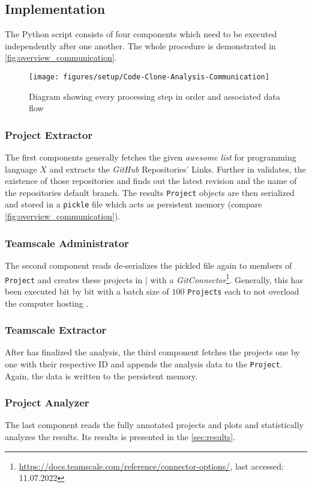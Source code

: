 \subsection{Implementation}
\label{sec:implementation}

The Python script consists of four components which need to be executed independently after one another. The whole procedure is demonstrated in \autoref{fig:overview_communication}.

\begin{figure}[htb]
	\centering
	\texttt{[image: figures/setup/Code-Clone-Analysis-Communication]}
	\caption{Diagram showing every processing step in order and associated data flow}
	\label{fig:overview_communication}
\end{figure}

\subsubsection{Project Extractor}

The first components generally fetches the given \textit{awesome list} for programming language $X$ and extracts the \textit{GitHub} Repositories' Links. Further in validates, the existence of those repositories and finds out the latest revision and the name of the repositories default branch. The results \texttt{Project} objects are then serialized and stored in a \texttt{pickle} file which acts as persistent memory (compare \autoref{fig:overview_communication}).

\subsubsection{Teamscale Administrator}

The second component reads de-serializes the pickled file again to members of \texttt{Project} and creates these projects in \teamscale|{} with a \textit{GitConnector}\footnote{\url{https://docs.teamscale.com/reference/connector-options/}, last accessed: 11.07.2022}. Generally, this has been executed bit by bit with a batch size of $100$ \texttt{Projects} each to not overload the computer hosting \teamscale{}.

\subsubsection{Teamscale Extractor}

After \teamscale{} has finalized the analysis, the third component fetches the projects one by one with their respective ID and appends the analysis data to the \texttt{Project}. Again, the data is written to the persistent memory.

\subsubsection{Project Analyzer}

The last component reads the fully annotated projects and plots and statistically analyzes the results. Its results is presented in the \autoref{sec:results}.